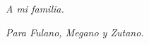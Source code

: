 
\vspace*{0.9in}

\begin{flushright}
\begin{Large}

\textit{A mi familia.}
\vspace*{0.3in}

\textit{Para Fulano, Megano y Zutano.}


\end{Large}
\end{flushright}
